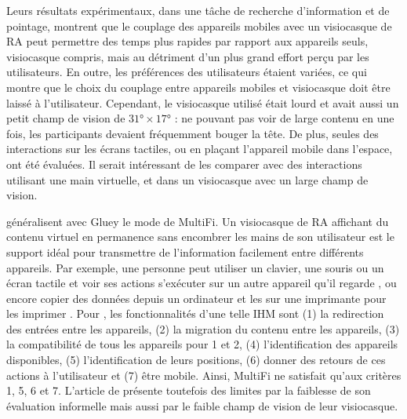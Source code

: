 Leurs résultats expérimentaux, dans une tâche de recherche d'information et de pointage, montrent que le couplage des appareils mobiles avec un visiocasque de RA peut permettre des temps plus rapides par rapport aux appareils seuls, visiocasque compris, mais au détriment d'un plus grand effort perçu par les utilisateurs. En outre, les préférences des utilisateurs étaient variées, ce qui montre que le choix du couplage entre appareils mobiles et visiocasque doit être laissé à l'utilisateur. Cependant, le visiocasque utilisé était lourd et avait aussi un petit champ de vision de $\ang{31} \times \ang{17}$ : ne pouvant pas voir de large contenu en une fois, les participants devaient fréquemment bouger la tête. De plus, seules des interactions sur les écrans tactiles, ou en plaçant l'appareil mobile dans l'espace, ont été évaluées. Il serait intéressant de les comparer avec des interactions utilisant une main virtuelle, et dans un visiocasque avec un large champ de vision.


\cite{Serrano2015} généralisent avec Gluey le mode  de MultiFi. Un visiocasque de RA affichant du contenu virtuel en permanence sans encombrer les mains de son utilisateur est le support idéal pour transmettre de l'information facilement entre différents appareils. Par exemple, une personne peut utiliser un clavier, une souris ou un écran tactile et voir ses actions s'exécuter sur un autre appareil qu'il regarde , ou encore copier des données depuis un ordinateur et les  sur une imprimante pour les imprimer . Pour \citeauthor{Serrano2015}, les fonctionnalités d'une telle IHM sont (1) la redirection des entrées entre les appareils, (2) la migration du contenu entre les appareils, (3) la compatibilité de tous les appareils pour 1 et 2, (4) l'identification des appareils disponibles, (5) l'identification de leurs positions, (6) donner des retours de ces actions à l'utilisateur et (7) être mobile. Ainsi, MultiFi ne satisfait qu'aux critères 1, 5, 6 et 7. L'article de \citeauthor{Serrano2015} présente toutefois des limites par la faiblesse de son évaluation informelle mais aussi par le faible champ de vision de leur visiocasque.

